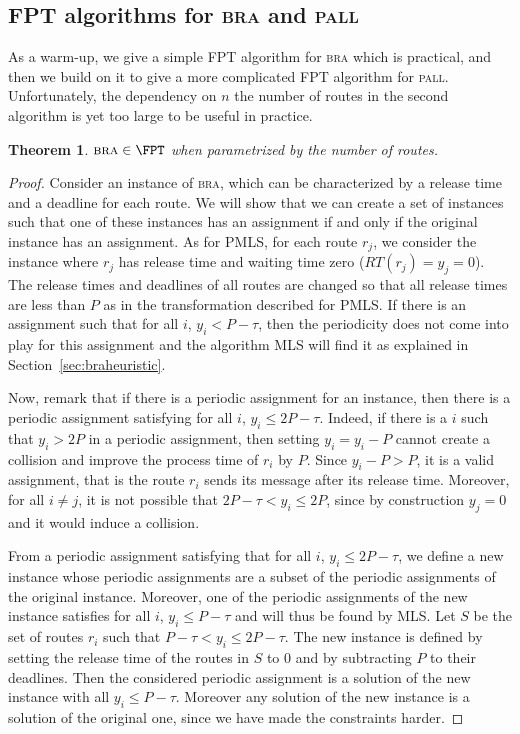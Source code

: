 \documentclass[10pt, conference, letterpaper]{IEEEtran}
\newtheorem{theorem}{Theorem}
\newcommand\pall{\textsc{pall}\xspace}
\newcommand\bra{\textsc{bra}\xspace}
\begin{document}
\subsection{FPT algorithms for \bra and \pall}

As a warm-up, we give a simple FPT algorithm for \bra which is practical,
and then we build on it to give a more complicated FPT algorithm for \pall. Unfortunately, the dependency on $n$ the number of routes in the second algorithm is yet too large to be useful in practice. 

\begin{theorem}\label{th:braFPT}
$\bra \in \FPT$ when parametrized by the number of routes.
\end{theorem}
\begin{proof}
 Consider an instance of \bra, which can be characterized by a release time and a deadline for each route.
 We will show that we can create a set of instances such that one of these instances has an assignment if and only if the original instance has an assignment. As for PMLS, for each route $r_j$, we consider the instance where $r_j$ has release time and waiting time zero ($RT(r_j) = y_j = 0$). The release times and deadlines of all routes are changed so that all release times are less than $P$ as in the transformation described for PMLS. If there is an assignment such that for all $i$, $y_i < P-\tau$, then the periodicity does not come into play for this assignment and the algorithm MLS will find it as explained in Section~\ref{sec:braheuristic}.

 Now, remark that if there is a periodic assignment for an instance, then there is a periodic assignment satisfying for all $i$, $y_i \leq 2P - \tau$.  Indeed, if there is a $i$ such that $y_i > 2P$ in
a periodic assignment, then setting $y_i = y_i - P$ cannot create a collision and improve the 
process time of $r_i$ by $P$. Since $y_i - P > P$, it is a valid assignment, that is the route $r_i$ sends its message after its release time. Moreover, for all $i \neq j$, it is not possible that $2P-\tau < y_i \leq 2P$, since by construction $y_j = 0$ and it would induce a collision.
 

From a periodic assignment satisfying that for all $i$, $y_i \leq 2P - \tau$, we define 
a new instance whose periodic assignments are a subset of the periodic assignments of the original instance. Moreover, one of the periodic assignments of the new instance satisfies for all $i$, $y_i \leq P - \tau$ and will thus be found by MLS. Let $S$ be the set of routes $r_i$ such that  $P - \tau < y_i \leq 2P - \tau$. The new instance is defined by setting the release time of the routes in $S$ to $0$ and by subtracting $P$ to their deadlines. Then the considered periodic assignment is a solution of the new instance with all $y_i \leq P -\tau$. Moreover any solution of the new instance is a solution of the original one, since we have made the constraints harder.   


\end{proof}
\end{document}
